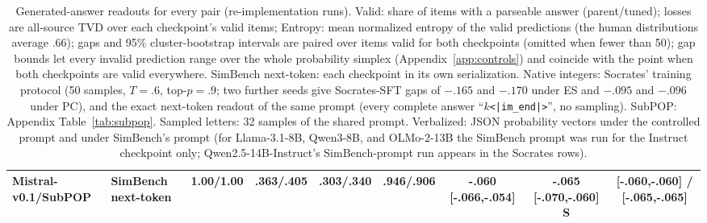 \begin{table}[t]
\begin{tabular}{@{}llccccccc@{}}
Mistral-v0.1/SubPOP & SimBench next-token & 1.00/1.00 & .363/.405 & .303/.340 & .946/.906 & -.060 [-.066,-.054] & -.065 [-.070,-.060] S & [-.060,-.060] / [-.065,-.065] \\
\bottomrule
\end{tabular}
\caption{Generated-answer readouts for every pair (re-implementation runs). Valid: share of items with a parseable answer (parent/tuned); losses are all-source TVD over each checkpoint's valid items; Entropy: mean normalized entropy of the valid predictions (the human distributions average .66); gaps and 95\% cluster-bootstrap intervals are paired over items valid for both checkpoints (omitted when fewer than 50); gap bounds let every invalid prediction range over the whole probability simplex (Appendix~\ref{app:controls}) and coincide with the point when both checkpoints are valid everywhere. SimBench next-token: each checkpoint in its own serialization. Native integers: Socrates' training protocol (50 samples, $T{=}.6$, top-$p{=}.9$; two further seeds give Socrates-SFT gaps of $-.165$ and $-.170$ under ES and $-.095$ and $-.096$ under PC), and the exact next-token readout of the same prompt (every complete answer ``$k$\texttt{<|im\_end|>}'', no sampling). SubPOP: Appendix Table~\ref{tab:subpop}. Sampled letters: 32 samples of the shared prompt. Verbalized: JSON probability vectors under the controlled prompt and under SimBench's prompt (for Llama-3.1-8B, Qwen3-8B, and OLMo-2-13B the SimBench prompt was run for the Instruct checkpoint only; Qwen2.5-14B-Instruct's SimBench-prompt run appears in the Socrates rows).}
\label{tab:generation}
\end{table}
